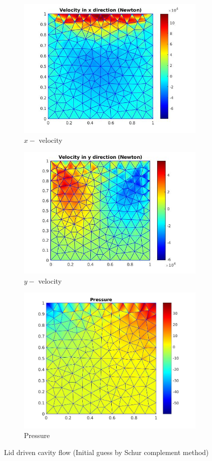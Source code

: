 \documentclass[a4paper,openany]{book}
\begin{document}
\begin{figure}
  \begin{subfigure}{\textwidth}
    \includegraphics[width=0.8\linewidth]{lid_newton_vx_schur.jpg}
    \caption{$x-$ velocity}
  \label{x_vel_navier_stoke_schur_lid}
  \end{subfigure}
  \begin{subfigure}{\textwidth}
    \includegraphics[width=0.8\linewidth]{lid_newton_vy_schur.jpg}
    \caption{$y-$ velocity}
  \label{y_vel_navier_stoke_schur_lid}
  \end{subfigure}
  \begin{subfigure}{\textwidth}
    \includegraphics[width=0.8\linewidth]{lid_newton_pressure_schur.jpg}
    \caption{Pressure}
  \label{pressure_navier_stoke_schur_lid}
  \end{subfigure}
\caption{Lid driven cavity flow (Initial guess by Schur complement method)}
\label{lid_driven_cavity_n_s_schur}
\end{figure}
\end{document}
